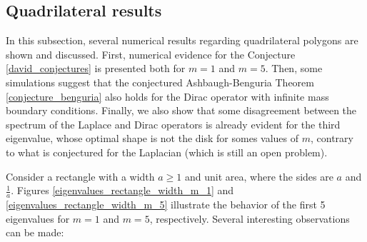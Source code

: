 \subsection{Quadrilateral results}\label{chap_numerics_dirac_quad_section}

In this subsection, several numerical results regarding quadrilateral polygons are shown and discussed. First, numerical evidence for the Conjecture \ref{david_conjectures} is presented both for \(m=1\) and \(m=5\). Then, some simulations suggest that the conjectured Ashbaugh-Benguria Theorem \ref{conjecture_benguria} also holds for the Dirac operator with infinite mass boundary conditions. Finally, we also show that some disagreement between the spectrum of the Laplace and Dirac operators is already evident for the third eigenvalue, whose optimal shape is not the disk for somes values of \(m\), contrary to what is conjectured for the Laplacian (which is still an open problem).

Consider a rectangle with a width \(a \geq 1\) and unit area, where the sides are \(a\) and \(\frac{1}{a}\). Figures \ref{eigenvalues_rectangle_width_m_1} and \ref{eigenvalues_rectangle_width_m_5} illustrate the behavior of the first 5 eigenvalues for \(m=1\) and \(m=5\), respectively. Several interesting observations can be made:

